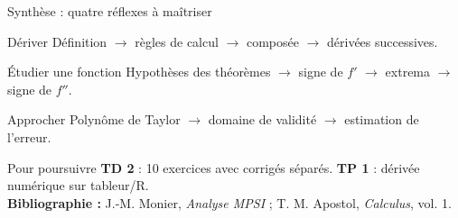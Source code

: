 \documentclass[aspectratio=169,11pt]{beamer}
\begin{document}
\begin{frame}{Synthèse : quatre réflexes à maîtriser}
\begin{block}{Dériver}
Définition $\to$ règles de calcul $\to$ composée $\to$ dérivées successives.
\end{block}
\begin{block}{Étudier une fonction}
Hypothèses des théorèmes $\to$ signe de $f'$ $\to$ extrema $\to$ signe de $f''$.
\end{block}
\begin{block}{Approcher}
Polynôme de Taylor $\to$ domaine de validité $\to$ estimation de l'erreur.
\end{block}
\begin{exampleblock}{Pour poursuivre}
\textbf{TD 2} : 10 exercices avec corrigés séparés. \quad \textbf{TP 1} : dérivée numérique sur tableur/R.\\
\textbf{Bibliographie :} J.-M. Monier, \emph{Analyse MPSI} ; T. M. Apostol, \emph{Calculus}, vol. 1.
\end{exampleblock}
\end{frame}
\end{document}
